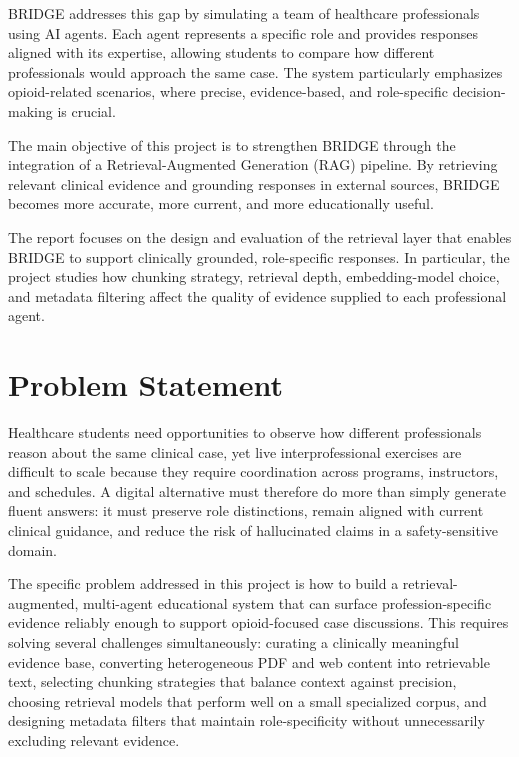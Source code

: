 \documentclass[12pt]{article}
\begin{document}
BRIDGE addresses this gap by simulating a team of healthcare professionals using AI agents. Each agent represents a specific role and provides responses aligned with its expertise, allowing students to compare how different professionals would approach the same case. The system particularly emphasizes opioid-related scenarios, where precise, evidence-based, and role-specific decision-making is crucial.

The main objective of this project is to strengthen BRIDGE through the integration of a Retrieval-Augmented Generation (RAG) pipeline. By retrieving relevant clinical evidence and grounding responses in external sources, BRIDGE becomes more accurate, more current, and more educationally useful.

The report focuses on the design and evaluation of the retrieval layer that enables BRIDGE to support clinically grounded, role-specific responses. In particular, the project studies how chunking strategy, retrieval depth, embedding-model choice, and metadata filtering affect the quality of evidence supplied to each professional agent.

\section{Problem Statement}

Healthcare students need opportunities to observe how different professionals reason about the same clinical case, yet live interprofessional exercises are difficult to scale because they require coordination across programs, instructors, and schedules. A digital alternative must therefore do more than simply generate fluent answers: it must preserve role distinctions, remain aligned with current clinical guidance, and reduce the risk of hallucinated claims in a safety-sensitive domain.

The specific problem addressed in this project is how to build a retrieval-augmented, multi-agent educational system that can surface profession-specific evidence reliably enough to support opioid-focused case discussions. This requires solving several challenges simultaneously: curating a clinically meaningful evidence base, converting heterogeneous PDF and web content into retrievable text, selecting chunking strategies that balance context against precision, choosing retrieval models that perform well on a small specialized corpus, and designing metadata filters that maintain role-specificity without unnecessarily excluding relevant evidence.
\end{document}
